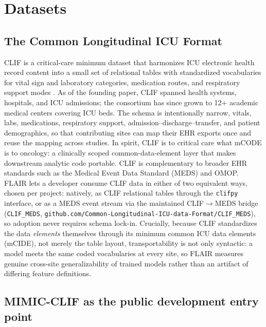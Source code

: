 \section{Datasets}
\label{sec:datasets}

\subsection*{The Common Longitudinal ICU Format}

CLIF is a critical-care minimum dataset that harmonizes ICU
electronic health record content into a small set of relational tables
with standardized vocabularies for vital sign and laboratory
categories, medication routes, and respiratory support modes
\citep{rojas2025clif}. As of the founding paper, CLIF spanned
 health systems,  hospitals, and
 ICU admissions; the consortium has since grown
to 12+ academic medical centers covering  ICU beds.
The schema is intentionally narrow, vitals, labs, medications,
respiratory support, admission--discharge--transfer, and patient
demographics, so that contributing sites can map their EHR exports
once and reuse the mapping across studies. In spirit, CLIF is to
critical care what mCODE \citep{mcode2024hl7} is to oncology: a
clinically scoped common-data-element layer that makes downstream
analytic code portable. CLIF is complementary to broader EHR standards
such as the Medical Event Data Standard (MEDS) \citep{arnrich2025meds}
and OMOP. FLAIR lets a developer consume CLIF data in either of two
equivalent ways, chosen per project: natively, as CLIF relational
tables through the \texttt{clifpy} interface, or as a MEDS event stream
via the maintained CLIF$\rightarrow$MEDS bridge (\texttt{CLIF\_MEDS},
\texttt{github.com/Common-Longitudinal-ICU-data-Format/CLIF\_MEDS}), so
adoption never requires schema lock-in. Crucially, because CLIF
standardizes the data \emph{elements} themselves through its minimum
common ICU data elements (mCIDE), not merely the table layout, 
transportability is not only syntactic: a model meets the same coded
vocabularies at every site, so FLAIR measures genuine cross-site
generalizability of trained models rather than an artifact of differing
feature definitions.

\subsection*{MIMIC-CLIF as the public development entry point}

